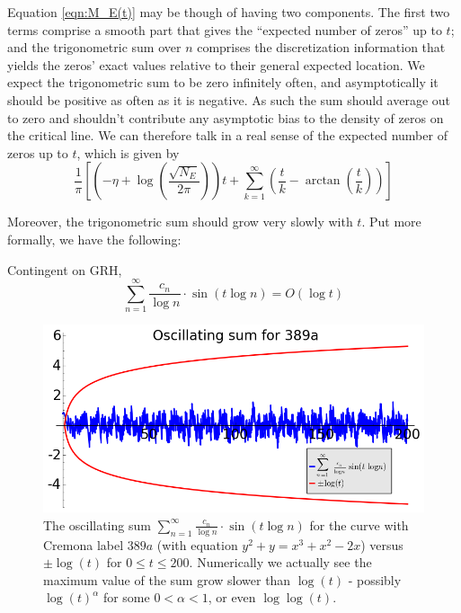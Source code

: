 Equation \ref{eqn:M_E(t)} may be though of having two components. The first two terms comprise a smooth part that gives the ``expected number of zeros'' up to $t$; and the trigonometric sum over $n$ comprises the discretization information that yields the zeros' exact values relative to their general expected location. We expect the trigonometric sum to be zero infinitely often, and asymptotically it should be positive as often as it is negative. As such the sum should average out to zero and shouldn't contribute any asymptotic bias to the density of zeros on the critical line. We can therefore talk in a real sense of the expected number of zeros up to $t$, which is given by
\begin{equation}\label{eqn:M_E_smooth_part}
\frac{1}{\pi}\left[\left(-\eta+\log\left(\frac{\sqrt{N_E}}{2\pi}\right)\right) t + \sum_{k=1}^{\infty} \left(\frac{t}{k} - \arctan\left(\frac{t}{k}\right)\right)\right]
\end{equation}

Moreover, the trigonometric sum should grow very slowly with $t$. Put more formally, we have the following:
\begin{conjecture}\label{conj:trig_sum_size}
Contingent on GRH,
\begin{equation}
\sum_{n=1}^{\infty} \frac{c_n}{\log n}\cdot \sin(t\log n) = O(\log t)
\end{equation}
\end{conjecture}

\begin{figure}[!h]
    \centering
    \includegraphics[width=1.0\textwidth]{graphics/M_E_trig_sum_bounds.png}
    \caption{The oscillating sum $\sum_{n=1}^{\infty} \frac{c_n}{\log n}\cdot \sin(t\log n)$ for the curve with Cremona label $389a$ (with equation $y^2 + y = x^3 + x^2 - 2x$) versus $\pm \log(t)$ for $0\le t \le 200$. Numerically we actually see the maximum value of the sum grow slower than $\log(t)$ - possibly $\log(t)^{\alpha}$ for some $0<\alpha<1$, or even $\log\log(t)$.}
    \label{fig:M_E_trig_sum_bounds}
\end{figure}


